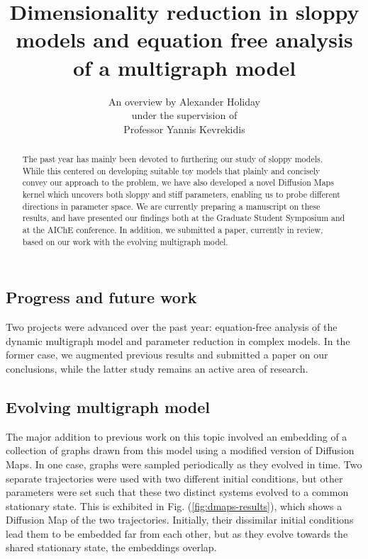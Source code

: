 \documentclass[12pt]{article}
\begin{document}
\title{\vspace{-1cm}Dimensionality reduction in sloppy models and equation free analysis of a multigraph model}
\author{\LARGE An overview by Alexander Holiday\vspace{3mm}\\\Large  under the supervision of\vspace{3mm}\\\LARGE  Professor Yannis Kevrekidis}

\maketitle
\begin{spacing}{2}
\begin{abstract}
  The past year has mainly been devoted to furthering our study of
  sloppy models. While this centered on developing suitable toy models
  that plainly and concisely convey our approach to the problem, we
  have also developed a novel Diffusion Maps kernel which uncovers
  both sloppy and stiff parameters, enabling us to probe different
  directions in parameter space. We are currently preparing a
  manuscript on these results, and have presented our findings both at
  the Graduate Student Symposium and at the AIChE conference. In
  addition, we submitted a paper, currently in review, based on our
  work with the evolving multigraph model.
\end{abstract}

\section*{Progress and future work}

\indent Two projects were advanced over the past year: equation-free
analysis of the dynamic multigraph model and parameter reduction in
complex models. In the former case, we augmented previous results and
submitted a paper on our conclusions, while the latter study remains
an active area of research.

\subsection*{Evolving multigraph model}

The major addition to previous work on this topic involved an
embedding of a collection of graphs drawn from this model using a
modified version of Diffusion Maps. In one case, graphs were sampled
periodically as they evolved in time. Two separate trajectories were
used with two different initial conditions, but other parameters were set
such that these two distinct systems evolved to a common stationary
state. This is exhibited in Fig. (\ref{fig:dmaps-results}), which shows a
Diffusion Map of the two trajectories. Initially, their dissimilar
initial conditions lead them to be embedded far from each other, but
as they evolve towards the shared stationary state, the embeddings
overlap. \\


\end{spacing}
\end{document}
